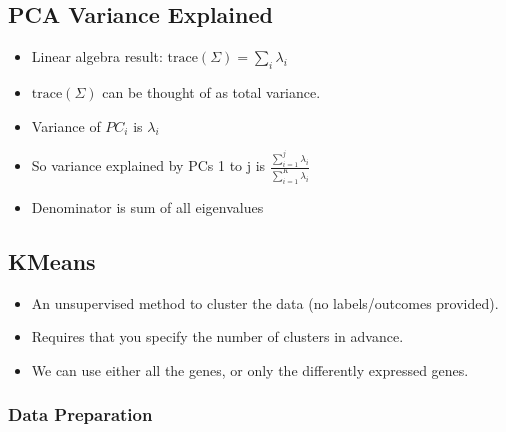 \documentclass[
]{article}
\providecommand{\tightlist}{%
  \setlength{\itemsep}{0pt}\setlength{\parskip}{0pt}}
\begin{document}
\hypertarget{pca-variance-explained}{%
\subsection{PCA Variance Explained}\label{pca-variance-explained}}

\begin{itemize}
\tightlist
\item
  Linear algebra result: \(\text{trace}(\Sigma) = \sum_i \lambda_i\)
\item
  \(\text{trace}(\Sigma)\) can be thought of as total variance.
\item
  Variance of \(PC_i\) is \(\lambda_i\)
\item
  So variance explained by PCs 1 to j is
  \(\frac{\sum_{i = 1}^j \lambda_i}{\sum_{i = 1}^K \lambda_i}\)
\item
  Denominator is sum of all eigenvalues
\end{itemize}

\hypertarget{kmeans}{%
\subsection{KMeans}\label{kmeans}}

\begin{itemize}
\tightlist
\item
  An unsupervised method to cluster the data (no labels/outcomes
  provided).
\item
  Requires that you specify the number of clusters in advance.
\item
  We can use either all the genes, or only the differently expressed
  genes.
\end{itemize}

\hypertarget{data-preparation}{%
\subsubsection{Data Preparation}\label{data-preparation}}
\end{document}
